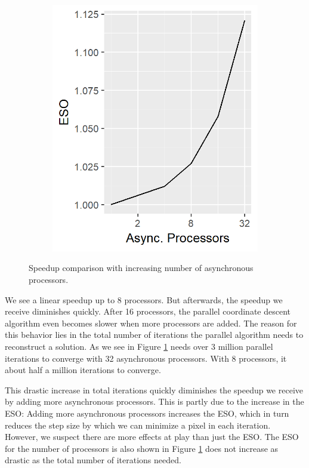\begin{figure}
\begin{subfigure}{0.30\linewidth}
	\end{subfigure}
	\begin{subfigure}{0.30\linewidth}
		\includegraphics[width=1.0\linewidth]{./chapters/05.pcdm/scalability/speedup_pcdm_eso.png}
	\end{subfigure}
	\caption{Speedup comparison with increasing number of asynchronous processors.}
	\label{pcdm:scalability:proc}
\end{figure}

We see a linear speedup up to 8 processors. But afterwards, the speedup we receive diminishes quickly. After 16 processors, the parallel coordinate descent algorithm even becomes slower when more processors are added. The reason for this behavior lies in the total number of iterations the parallel algorithm needs to reconstruct a solution. As we see in Figure \ref{pcdm:scalability:proc} needs over 3 million parallel iterations to converge with 32 asynchronous processors. With 8 processors, it about half a million iterations to converge.

This drastic increase in total iterations quickly diminishes the speedup we receive by adding more asynchronous processors. This is partly due to the increase in the ESO: Adding more asynchronous processors increases the ESO, which in turn reduces the step size by which we can minimize a pixel in each iteration. However, we suspect there are more effects at play than just the ESO. The ESO for the number of processors is also shown in Figure \ref{pcdm:scalability:proc} does not increase as drastic as the total number of iterations needed. 

